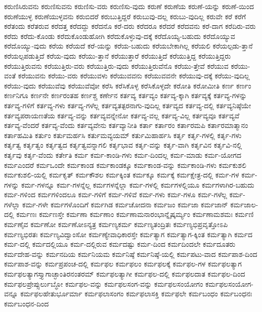 {ಕರುಣಿಸಿರುವನು
ಕರುಣಿಸುವನು
ಕರುಣಿಸು-ವರು
ಕರುಣಿಸು-ವುದು
ಕರುಣೆ
ಕರುಣೆಯ
ಕರುಣೆ-ಯನ್ನು
ಕರುಣೆ-ಯಿಂದ
ಕರುಣೆಯುಳ್ಳ
ಕರುಣೆಯುಳ್ಳವನು
ಕರುಬಿದರೆ
ಕರುಬುತ್ತಿದ್ದರೆ
ಕರುಬುವು-ದಲ್ಲ
ಕರುಬು-ವುದಿಲ್ಲ
ಕರುವೇ
ಕರೆ
ಕರೆಗೆ
ಕರೆತಂದು
ಕರೆತರುವ
ಕರೆದತ್ತ
ಕರೆದದ್ದು
ಕರೆದನೊ
ಕರೆ-ದರು
ಕರೆದರೂ
ಕರೆದರೆ
ಕರೆದವನು
ಕರೆ-ದಾಗ
ಕರೆದಿರು-ವರು
ಕರೆದು
ಕರೆದು-ಕೊಂಡು
ಕರೆದುಕೊಂಡುಹೋಗಿ
ಕರೆದುಕೊಳ್ಳುವು-ದಕ್ಕೆ
ಕರೆದೊಯ್ಯ-ಬಹುದು
ಕರೆದೊಯ್ಯುವ
ಕರೆದೊಯ್ಯು-ವುದು
ಕರೆಯ
ಕರೆಯದೆ
ಕರೆ-ಯನ್ನು
ಕರೆಯ-ಬಹುದು
ಕರೆಯಬೇಕಾಗಿಲ್ಲ
ಕರೆಯಲಿ
ಕರೆಯಲ್ಪಡು-ತ್ತಾನೆ
ಕರೆಯಲ್ಪಪಡುತ್ತಿದೆ
ಕರೆಯ-ವುದು
ಕರೆಯು-ತ್ತಾನೆ
ಕರೆಯುತ್ತಾರೆ
ಕರೆಯುತ್ತಿದೆ
ಕರೆಯುತ್ತಿದ್ದ
ಕರೆಯುತ್ತಿದ್ದರು
ಕರೆಯುತ್ತಿರುವನು
ಕರೆಯುತ್ತಿರು-ವರು
ಕರೆಯುತ್ತಿರು-ವುದು
ಕರೆಯುತ್ತಿರುವೆನೊ
ಕರೆಯು-ತ್ತೇವೆ
ಕರೆಯುವ
ಕರೆಯು-ವಂತೆ
ಕರೆಯುವನು
ಕರೆಯು-ವರು
ಕರೆಯುವಳು
ಕರೆಯುವವನು
ಕರೆಯುವವನೇ
ಕರೆಯುವು-ದಕ್ಕೆ
ಕರೆಯು-ವುದಿಲ್ಲ
ಕರೆಯು-ವುದು
ಕರೆಯುವೆವು
ಕರೆಯುವೆವೋ
ಕರೆಸಿ
ಕರೆಸಿಕೊಳ್ಳ
ಕರೆಸಿಕೊಳ್ಳದೇ
ಕರೋತಿ
ಕರೋಮೀತಿ
ಕರ್ಣ
ಕರ್ಣಂ
ಕರ್ಣನಿಗೂ
ಕರ್ಣನೇ
ಕರ್ಣರಂತಹ
ಕರ್ಣಶ್ಚ
ಕರ್ಣೇನ
ಕರ್ತವ್ಯ
ಕರ್ತವ್ಯಂ
ಕರ್ತವ್ಯ-ಕ್ಕಾಗಿ
ಕರ್ತವ್ಯಕ್ಕೆ
ಕರ್ತವ್ಯ-ಗಳನ್ನು
ಕರ್ತವ್ಯ-ಗಳಿಗೆ
ಕರ್ತವ್ಯ-ಗಳು
ಕರ್ತವ್ಯ-ಗಳೆಲ್ಲ
ಕರ್ತವ್ಯತತ್ಪರನಾಗು-ವುದಿಲ್ಲ
ಕರ್ತವ್ಯದ
ಕರ್ತವ್ಯ-ದಲ್ಲಿ
ಕರ್ತವ್ಯನಿಷ್ಠೆಯೇ
ಕರ್ತವ್ಯಪರಾಯಣತೆಯ
ಕರ್ತವ್ಯ-ವನ್ನು
ಕರ್ತವ್ಯವನ್ನೇನೋ
ಕರ್ತವ್ಯ-ವಲ್ಲ
ಕರ್ತವ್ಯ-ವಿಲ್ಲ
ಕರ್ತವ್ಯವೂ
ಕರ್ತವ್ಯವೆ
ಕರ್ತವ್ಯ-ವೆಂದರೆ
ಕರ್ತವ್ಯ-ವೆಂದು
ಕರ್ತವ್ಯವೇನು
ಕರ್ತವ್ಯಾನೀತಿ
ಕರ್ತಾ
ಕರ್ತಾರಂ
ಕರ್ತಾರಮಪಿ
ಕರ್ತಾರಮಾತ್ಮಾನಂ
ಕರ್ತಾಹಮಿತಿ
ಕರ್ತುಂ
ಕರ್ತುಮರ್ಹಸಿ
ಕರ್ತುಮವ್ಯಯಮ್
ಕರ್ತುಮಿಹಾರ್ಹಸಿ
ಕರ್ತೃ
ಕರ್ತೃ-ಗಳಲ್ಲಿ
ಕರ್ತೃ-ಗಳು
ಕರ್ತೃತ್ವ
ಕರ್ತೃತ್ವಂ
ಕರ್ತೃತ್ವದ
ಕರ್ತೃತ್ವವನ್ನಾಗಲಿ
ಕರ್ತೃಭಾವ
ಕರ್ತೃ-ವನ್ನು
ಕರ್ತೃ-ವಾಗಿ
ಕರ್ತೃವಿನ
ಕರ್ತೃವಿ-ನಲ್ಲಿ
ಕರ್ತೃವು
ಕರ್ತೃ-ವೆಂದು
ಕರ್ತೇತಿ
ಕರ್ಮ
ಕರ್ಮ-ಕಾಂಡಿ-ಗಳು
ಕರ್ಮ-ದಿಂದಲ್ಲ
ಕರ್ಮ-ಮಾಡು
ಕರ್ಮ-ಯೋಗದ
ಕರ್ಮಎಂದರೆ
ಕರ್ಮಒಂದೇ
ಕರ್ಮಕಾಂಡ
ಕರ್ಮಕಾಂಡಕ್ಕೂ
ಕರ್ಮಕಾಂಡ-ವನ್ನು
ಕರ್ಮಕಾಂಡಿ-ಗಳು
ಕರ್ಮಕುಶಲಿ
ಕರ್ಮಕುಶಲಿ-ಯಲ್ಲಿ
ಕರ್ಮಕೃತ್
ಕರ್ಮಕೌಶಲ
ಕರ್ಮಕ್ಕಿಂತ
ಕರ್ಮಕ್ಕೂ
ಕರ್ಮಕ್ಕೆ
ಕರ್ಮಕ್ಷೇತ್ರ-ದಲ್ಲಿ
ಕರ್ಮ-ಗಳ
ಕರ್ಮ-ಗಳನ್ನು
ಕರ್ಮ-ಗಳನ್ನೂ
ಕರ್ಮ-ಗಳನ್ನೆಲ್ಲ
ಕರ್ಮಗಳನ್ನೆಲ್ಲಾ
ಕರ್ಮ-ಗಳಲ್ಲಿ
ಕರ್ಮಗಳಲ್ಲಿಯೂ
ಕರ್ಮಗಳಾಗಿರ-ಬಹುದು
ಕರ್ಮ-ಗಳಿಂದ
ಕರ್ಮಗಳಿಂದಲೂ
ಕರ್ಮ-ಗಳಿಗೆ
ಕರ್ಮ-ಗಳಿವೆ
ಕರ್ಮ-ಗಳು
ಕರ್ಮ-ಗಳೂ
ಕರ್ಮ-ಗಳೆಲ್ಲ
ಕರ್ಮ-ಗಳೆಲ್ಲಾ
ಕರ್ಮ-ಗಳೇ
ಕರ್ಮಗಳೊಂದಿಗೆ
ಕರ್ಮಗಿಡ
ಕರ್ಮಚೋದನಾ
ಕರ್ಮಜಂ
ಕರ್ಮಜಾ
ಕರ್ಮಜಾನ್
ಕರ್ಮಜಾಲ-ದಲ್ಲಿ
ಕರ್ಮಣಃ
ಕರ್ಮಣಸ್ತೇ
ಕರ್ಮಣಾ
ಕರ್ಮಣಾಂ
ಕರ್ಮಣಾಮನಾರಂಭಾನ್ನೈಷ್ಕರ್ಮ್ಯಂ
ಕರ್ಮಣಾಮಶಮಃ
ಕರ್ಮಣಿ
ಕರ್ಮಣೈವ
ಕರ್ಮಣೋ
ಕರ್ಮಣೋಽನ್ಯತ್ರ
ಕರ್ಮಣ್ಯಕರ್ಮ
ಕರ್ಮಣ್ಯತಂದ್ರಿತಃ
ಕರ್ಮಣ್ಯಭಿಪ್ರವೃತ್ತೋಽಪಿ
ಕರ್ಮಣ್ಯಭಿರತಃ
ಕರ್ಮಣ್ಯವಿದ್ವಾಂಸೋ
ಕರ್ಮಣ್ಯೇವಾಧಿಕಾರಸ್ತೇ
ಕರ್ಮತ್ಯಾಗ
ಕರ್ಮತ್ಯಾಗ-ಕ್ಕಿಂತ
ಕರ್ಮತ್ಯಾಗಿ
ಕರ್ಮದ
ಕರ್ಮ-ದಲ್ಲಿ
ಕರ್ಮದಲ್ಲಿಯೂ
ಕರ್ಮ-ದಲ್ಲಿರುವ
ಕರ್ಮದಷ್ಟು
ಕರ್ಮ-ದಿಂದ
ಕರ್ಮದಿಂದಲೇ
ಕರ್ಮದೂತರು
ಕರ್ಮದೇಹ-ವನ್ನು
ಕರ್ಮನದಿಯ
ಕರ್ಮನಿಯಮ
ಕರ್ಮನಿಷ್ಠೆ
ಕರ್ಮನಿಷ್ಠೆ-ಯಲ್ಲಿ
ಕರ್ಮಪಟು-ವಾದ
ಕರ್ಮಪಾಶ-ದಿಂದ
ಕರ್ಮಪಾಶ-ವನ್ನು
ಕರ್ಮಪ್ರಪಂಚ-ದಲ್ಲಿ
ಕರ್ಮಫಲ
ಕರ್ಮಫಲಂ
ಕರ್ಮಫಲಕ್ಕೆ
ಕರ್ಮಫಲ-ಗಳ
ಕರ್ಮಫಲತ್ಯಾಗ
ಕರ್ಮಫಲತ್ಯಾಗಸ್ತ್ಯಾಗಾಚ್ಛಾಂತಿರನಂತರಮ್
ಕರ್ಮಫಲತ್ಯಾಗೀ
ಕರ್ಮಫಲ-ದಲ್ಲಿ
ಕರ್ಮಫಲದಾತ
ಕರ್ಮಫಲ-ದಿಂದ
ಕರ್ಮಫಲಪ್ರೇಪ್ಸುರ್ಲುಬ್ಧೋ
ಕರ್ಮಫಲ-ವನ್ನು
ಕರ್ಮಫಲಸಂಗ-ವನ್ನು
ಕರ್ಮಫಲಸಂಯೋಗಂ
ಕರ್ಮಫಲಸಂಯೋಗ-ವನ್ನೂ
ಕರ್ಮಫಲಹೇತುರ್ಭೂರ್ಮಾ
ಕರ್ಮಫಲಾಸಂಗಂ
ಕರ್ಮಫಲಾಸಕ್ತಿ
ಕರ್ಮಫಲೇ
ಕರ್ಮಬಂಧಂ
ಕರ್ಮಬಂಧನಃ
ಕರ್ಮಬಂಧನ-ದಿಂದ
}
